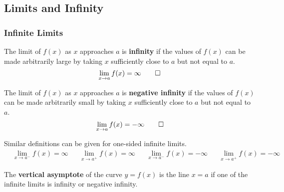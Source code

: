 \subsection{Limits and Infinity}
\subsubsection{Infinite Limits}
\begin{definition}
    The limit of \(f(x)\) as \(x\) approaches \(a\) is \textbf{infinity} if
    the values of \(f(x)\) can be made arbitrarily large by taking \(x\)
    sufficiently close to \(a\) but not equal to \(a\).
    \[\lim_{x\to a}f(x)=\infty \qedhere\]
\end{definition}
\begin{definition}
    The limit of \(f(x)\) as \(x\) approaches \(a\) is
    \textbf{negative infinity} if the values of \(f(x)\) can be made
    arbitrarily small by taking \(x\) sufficiently close to \(a\) but not
    equal to \(a\).
    \[\lim_{x\to a}f(x)=-\infty \qedhere\]
\end{definition}
Similar definitions can be given for one-sided infinite limits.
\begin{align*}
    &\lim_{x\to a^-}f(x)=\infty&&\lim_{x\to a^+}f(x)=\infty&
    &\lim_{x\to a^-}f(x)=-\infty&&\lim_{x\to a^+}f(x)=-\infty&
\end{align*}
\begin{definition}
    The \textbf{vertical asymptote} of the curve \(y=f(x)\) is the line
    \(x=a\) if one of the infinite limits is infinity or negative infinity.
\end{definition}

